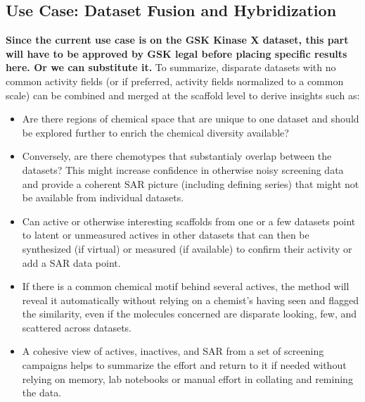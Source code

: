 \documentclass[journal=jacsat,manuscript=article]{achemso}
\begin{document}
\subsection{Use Case: Dataset Fusion and Hybridization}
\textbf{Since the current use case is on the GSK Kinase X dataset, this part will have to be approved by GSK legal before placing specific results here. Or we can substitute it.} 
To summarize, disparate datasets with no common activity fields (or if preferred, activity fields normalized to a common scale) can be combined and merged at the scaffold level to derive insights such as:
\begin{itemize}
\item Are there regions of chemical space that are unique to one dataset and should be explored further to enrich the chemical diversity available?
\item Conversely, are there chemotypes that substantialy overlap between the datasets?  This might increase confidence in otherwise noisy screening data and provide a coherent SAR picture (including defining series) that might not be available from individual datasets.
\item Can active or otherwise interesting scaffolds from one or a few datasets point to latent or unmeasured actives in other datasets that can then be synthesized (if virtual) or measured (if available) to confirm their activity or add a SAR data point. 
\item If there is a common chemical motif behind several actives, the method will reveal it automatically without relying on a chemist's having seen and flagged the similarity, even if the molecules concerned are disparate looking, few, and scattered across datasets.
\item A cohesive view of actives, inactives, and SAR from a set of screening campaigns helps to summarize the effort and return to it if needed without relying on memory, lab notebooks or manual effort in collating and remining the data.   
\end{itemize} 
\end{document}
